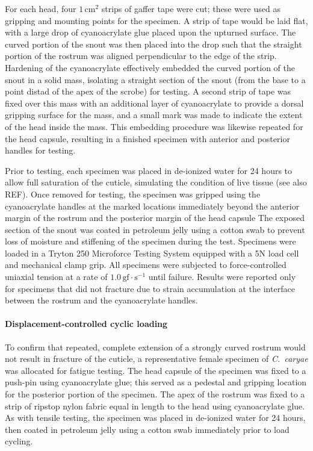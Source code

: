 \documentclass[twocolumn, linenumbers, superscriptaddress, nofootinbib]{revtex4-1}
\begin{document}
				For each head, four $1\,\text{cm}^2$ strips of gaffer tape were cut; these were used as gripping and mounting points for the specimen.
				A strip of tape would be laid flat, with a large drop of cyanoacrylate glue placed upon the upturned surface.
				The curved portion of the snout was then placed into the drop such that the straight portion of the rostrum was aligned perpendicular to the edge of the strip.
				Hardening of the cyanoacrylate effectively embedded the curved portion of the snout in a solid mass, isolating a straight section of the snout (from the base to a point distad of the apex of the scrobe) for testing.
				A second strip of tape was fixed over this mass with an additional layer of cyanoacrylate to provide a dorsal gripping surface for the mass, and a small mark was made to indicate the extent of the head inside the mass.
				This embedding procedure was likewise repeated for the head capsule, resulting in a finished specimen with anterior and posterior handles for testing.
				
				Prior to testing, each specimen was placed in de-ionized water for 24 hours to allow full saturation of the cuticle, simulating the condition of live tissue (see also REF).
				Once removed for testing, the specimen was gripped using the cyanoacrylate handles at the marked locations immediately beyond the anterior margin of the rostrum and the posterior margin of the head capsule
				The exposed section of the snout was coated in petroleum jelly using a cotton swab to prevent loss of moisture and stiffening of the specimen during the test.
				Specimens were loaded in a Tryton 250 Microforce Testing System equipped with a 5N load cell and mechanical clamp grip.
				All specimens were subjected to force-controlled uniaxial tension at a rate of $1.0\,\text{gf}\cdot\text{s}^{-1}$ until failure.
				Results were reported only for specimens that did not fracture due to strain accumulation at the interface between the rostrum and the cyanoacrylate handles.
				
			\paragraph*{Displacement-controlled cyclic loading}
				To confirm that repeated, complete extension of a strongly curved rostrum would not result in fracture of the cuticle, a representative female specimen of \textit{C.~caryae} was allocated for fatigue testing.
				The head capsule of the specimen was fixed to a push-pin using cyanoacrylate glue; this served as a pedestal and gripping location for the posterior portion of the specimen.
				The apex of the rostrum was fixed to a strip of ripstop nylon fabric equal in length to the head using cyanoacrylate glue.
				As with tensile testing, the specimen was placed in de-ionized water for 24 hours, then coated in petroleum jelly using a cotton swab immediately prior to load cycling.
				
\end{document}
